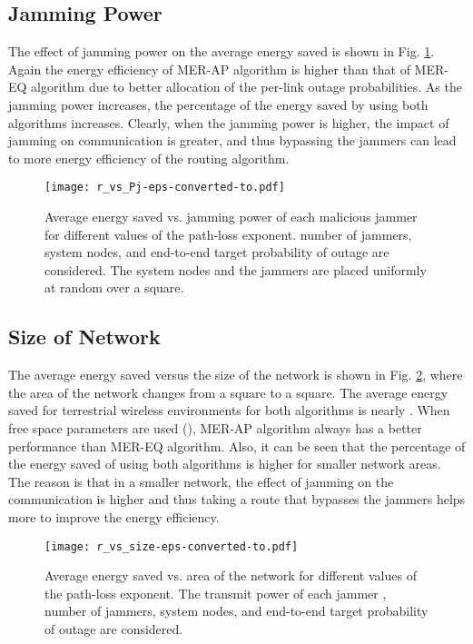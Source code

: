 \documentclass[10pt,journal]{IEEEtran}
\theoremstyle{definition}
\begin{document}
\subsection{Jamming Power}
The effect of jamming power on the average energy saved is shown in Fig. \ref{fig:r_vs_Pj}.
Again the energy efficiency of MER-AP algorithm is higher than that of MER-EQ algorithm due to better allocation of the per-link outage probabilities.
As the jamming power increases, the percentage of the energy saved by using both algorithms increases. 
Clearly, when the jamming power is higher,  the impact of jamming on  communication is greater, and thus  bypassing the jammers can lead to more energy efficiency of the routing algorithm.
\begin{figure}
\begin{center}
 \texttt{[image: r\_vs\_Pj-eps-converted-to.pdf]}
 \end{center}
 \vspace{-.1 in}
 \caption{Average energy saved vs. jamming power of each malicious jammer for different values of the path-loss exponent.    number of jammers,   system nodes, and end-to-end target probability of outage  are considered. The system nodes and the jammers are placed uniformly at random over a  square. }
 \label{fig:r_vs_Pj}
 \end{figure}

\subsection{Size of Network}
The average energy saved versus the size of the network is shown in Fig. \ref{fig:r_vs_size}, where the area of the network changes from a  square to a  square. 
The average energy saved for terrestrial wireless environments for both algorithms is nearly . 
When  free space parameters are used (), MER-AP algorithm always has a better performance than MER-EQ algorithm.
Also, it can be seen that  the percentage of the energy saved of using both algorithms is higher for smaller network areas.
The reason is that in a smaller network, the effect of jamming on the communication is higher and thus taking a route that bypasses the jammers helps more to improve the energy efficiency.
\begin{figure}
\begin{center}
 \texttt{[image: r\_vs\_size-eps-converted-to.pdf]}
 \end{center}
 \vspace{-.1 in}
 \caption{Average energy saved vs. area of the network for different values of the path-loss exponent.  The transmit power of each jammer ,   number of jammers,   system nodes, and end-to-end target probability of outage  are considered.  }
 \label{fig:r_vs_size}
 \end{figure}
\end{document}
